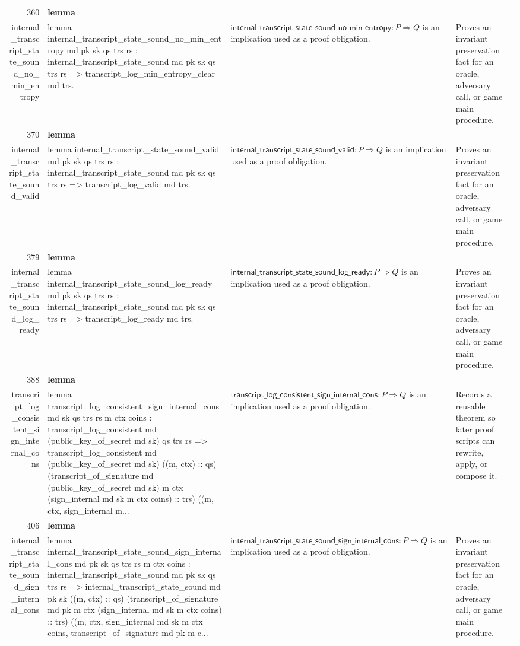 \documentclass[10pt]{article}
\newcommand{\ec}[1]{\begingroup\ttfamily\scriptsize #1\endgroup}
\begin{document}
\begin{longtable}{r L{0.17\textwidth} L{0.26\textwidth} L{0.27\textwidth} L{0.20\textwidth}}
360 & \textbf{lemma}\\\ec{internal\_transcript\_state\_sound\_no\_min\_entropy} & \ec{lemma internal\_transcript\_state\_sound\_no\_min\_entropy md pk sk qs trs rs : internal\_transcript\_state\_sound md pk sk qs trs rs => transcript\_log\_min\_entropy\_clear md trs.} & \(\mathsf{internal\_transcript\_state\_sound\_no\_min\_entropy} : P \Rightarrow Q\) is an implication used as a proof obligation. & Proves an invariant preservation fact for an oracle, adversary call, or game main procedure. \\
370 & \textbf{lemma}\\\ec{internal\_transcript\_state\_sound\_valid} & \ec{lemma internal\_transcript\_state\_sound\_valid md pk sk qs trs rs : internal\_transcript\_state\_sound md pk sk qs trs rs => transcript\_log\_valid md trs.} & \(\mathsf{internal\_transcript\_state\_sound\_valid} : P \Rightarrow Q\) is an implication used as a proof obligation. & Proves an invariant preservation fact for an oracle, adversary call, or game main procedure. \\
379 & \textbf{lemma}\\\ec{internal\_transcript\_state\_sound\_log\_ready} & \ec{lemma internal\_transcript\_state\_sound\_log\_ready md pk sk qs trs rs : internal\_transcript\_state\_sound md pk sk qs trs rs => transcript\_log\_ready md trs.} & \(\mathsf{internal\_transcript\_state\_sound\_log\_ready} : P \Rightarrow Q\) is an implication used as a proof obligation. & Proves an invariant preservation fact for an oracle, adversary call, or game main procedure. \\
388 & \textbf{lemma}\\\ec{transcript\_log\_consistent\_sign\_internal\_cons} & \ec{lemma transcript\_log\_consistent\_sign\_internal\_cons md sk qs trs rs m ctx coins : transcript\_log\_consistent md (public\_key\_of\_secret md sk) qs trs rs => transcript\_log\_consistent md (public\_key\_of\_secret md sk) ((m, ctx) :: qs) (transcript\_of\_signature md (public\_key\_of\_secret md sk) m ctx (sign\_internal md sk m ctx coins) :: trs) ((m, ctx, sign\_internal m...} & \(\mathsf{transcript\_log\_consistent\_sign\_internal\_cons} : P \Rightarrow Q\) is an implication used as a proof obligation. & Records a reusable theorem so later proof scripts can rewrite, apply, or compose it. \\
406 & \textbf{lemma}\\\ec{internal\_transcript\_state\_sound\_sign\_internal\_cons} & \ec{lemma internal\_transcript\_state\_sound\_sign\_internal\_cons md pk sk qs trs rs m ctx coins : internal\_transcript\_state\_sound md pk sk qs trs rs => internal\_transcript\_state\_sound md pk sk ((m, ctx) :: qs) (transcript\_of\_signature md pk m ctx (sign\_internal md sk m ctx coins) :: trs) ((m, ctx, sign\_internal md sk m ctx coins, transcript\_of\_signature md pk m c...} & \(\mathsf{internal\_transcript\_state\_sound\_sign\_internal\_cons} : P \Rightarrow Q\) is an implication used as a proof obligation. & Proves an invariant preservation fact for an oracle, adversary call, or game main procedure. \\

\end{longtable}
\end{document}
